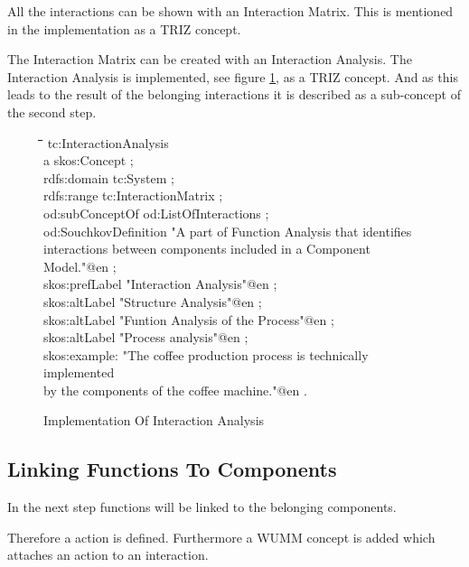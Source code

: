 \documentclass[11pt,a4paper]{article}
\newenvironment{code}{\tt \begin{tabbing}
\hskip12pt\=\hskip12pt\=\hskip12pt\=\hskip12pt\=\hskip5cm\=\hskip5cm\=\kill}
{\end{tabbing}}
\begin{document}
All the interactions can be shown with an Interaction Matrix.  This is
mentioned in the implementation as a TRIZ concept.

The Interaction Matrix can be created with an Interaction Analysis.  The
Interaction Analysis is implemented, see figure
\ref{fig:implementation_interaction_analysis}, as a TRIZ concept.  And as this
leads to the result of the belonging interactions it is described as a
sub-concept of the second step.

\begin{figure}[ht]
  \centering
  \begin{code}
    tc:InteractionAnalysis\\
    \> a skos:Concept ;\\
    \> rdfs:domain tc:System ;\\
    \> rdfs:range tc:InteractionMatrix ;\\
    \> od:subConceptOf od:ListOfInteractions ;\\
    \> od:SouchkovDefinition "A part of Function Analysis that identifies\\
    \> \> interactions between components included in a Component Model."@en ;\\
    \> skos:prefLabel "Interaction Analysis"@en ;\\
    \> skos:altLabel "Structure Analysis"@en ;\\
    \> skos:altLabel "Funtion Analysis of the Process"@en ;\\
    \> skos:altLabel "Process analysis"@en ;\\
    \> skos:example: "The coffee production process is technically implemented\\
    \> \> by the components of the coffee machine."@en .\\
  \end{code}
  \caption{Implementation Of Interaction Analysis}
  \label{fig:implementation_interaction_analysis}
\end{figure}

\subsection{Linking Functions To Components}

In the next step functions will be linked to the belonging components.

Therefore a action is defined.  Furthermore a WUMM concept is added which
attaches an action to an interaction.
\end{document}
